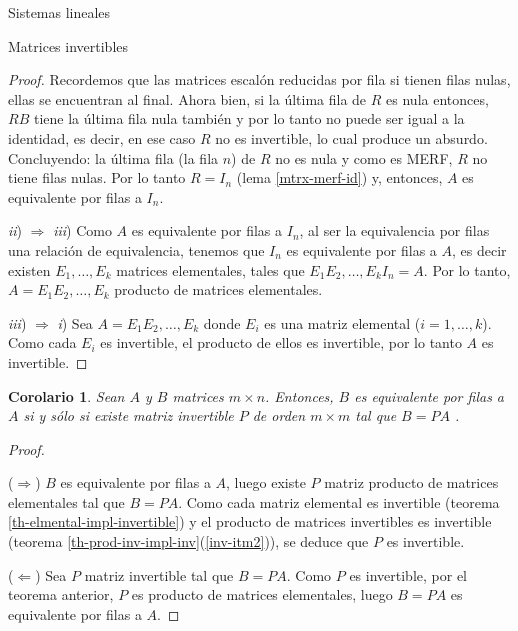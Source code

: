 \documentclass[a4paper,12pt,twoside,spanish]{amsbook}
\newtheorem{corolario}[teorema]{Corolario}
\theoremstyle{definition}
\theoremstyle{remark}
\begin{document}
\begin{chapter}{Sistemas lineales}
\begin{section}{Matrices invertibles}
\begin{proof}
				Recordemos que las matrices escalón reducidas por fila si tienen filas nulas, ellas se encuentran al final.  Ahora bien,  si la última fila de $R$ es nula entonces,  $RB$ tiene la última fila nula también y por lo tanto no puede ser igual a la identidad, es decir, en ese caso $R$ no es invertible, lo cual produce un absurdo. Concluyendo: la última fila (la fila $n$) de $R$ no es nula y como es MERF, $R$ no tiene filas nulas. Por lo tanto $R=I_n$ (lema \ref{mtrx-merf-id}) y,  entonces, $A$ es equivalente por filas a $I_n$. 
				
				\textit{ii}) $\Rightarrow$ \textit{iii})\; Como $A$  es equivalente por filas a $I_n$, al ser la equivalencia por filas una relación de equivalencia,  tenemos que $I_n$ es equivalente por filas a $A$, es decir  existen $E_1,\ldots,E_k$ matrices elementales, tales que $E_1E_2,\ldots,E_kI_n = A$. Por lo tanto, $A =E_1E_2,\ldots,E_k$ producto de matrices elementales.
				
				\textit{iii}) $\Rightarrow$ \textit{i}) \; Sea $A = E_1E_2,\ldots,E_k$ donde $E_i$  es una matriz elemental ($i=1,\ldots,k$). Como cada $E_i$ es invertible,  el producto de ellos es invertible,  por lo tanto $A$ es invertible.
			\end{proof}	
			
			\begin{corolario}
				Sean $A$ y $B$ matrices $m \times n$. Entonces,   $B$ es equivalente por filas a $A$ si y sólo si existe matriz invertible $P$ de orden $m \times m$ tal que $B =PA$ . 
			\end{corolario}
			\begin{proof}
				
				\
				
				($\Rightarrow$) $B$ es equivalente por filas a $A$,  luego existe $P$ matriz producto de matrices elementales tal que $B =PA$. Como cada matriz elemental es invertible (teorema \ref{th-elmental-impl-invertible}) y el producto de matrices invertibles es invertible (teorema  \ref{th-prod-inv-impl-inv}(\ref{inv-itm2})), se deduce que $P$ es invertible. 
				
				($\Leftarrow$) Sea  $P$  matriz invertible tal que $B =PA$. Como $P$ es invertible, por el teorema anterior, $P$ es producto de matrices elementales, luego $B =PA$ es equivalente por filas a $A$.
			\end{proof}	
			

\end{section}
\end{chapter}
\end{document}

